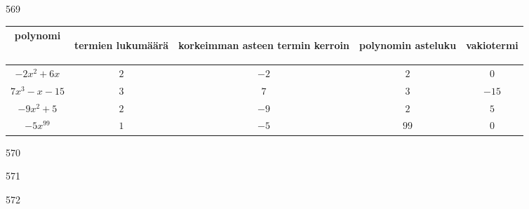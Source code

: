 \begin{Vastaus}{569}
    \begin{footnotesize}
	    \begin{tabular}{|c|c|c|c|c|}
	     \hline
polynomi     & \begin{sideways}termien lukumäärä\end{sideways}%
& \begin{sideways}korkeimman asteen termin kerroin\end{sideways}%
& \begin{sideways}polynomin asteluku\end{sideways}%
& \begin{sideways}vakiotermi\end{sideways} \\ \hline
$-2x^2+6x$   &        $2$          &         $-2$      &       $2$             &    $0$       \\ \hline
$7x^3-x-15$  &        $3$          &           $7$       &       $3$             &    $-15$   \\ \hline
$-9x^2+5$    &        $2$          &          $-9$     &       $2$             &    $5$       \\ \hline
$-5x^{99}$   &        $1$          &          $-5$     &       $99$            &         $0$      \\ \hline
   	  \end{tabular}
      \end{footnotesize}
     
\end{Vastaus}
\begin{Vastaus}{570}
    
\end{Vastaus}
\begin{Vastaus}{571}
	
\end{Vastaus}
\begin{Vastaus}{572}
    
\end{Vastaus}
